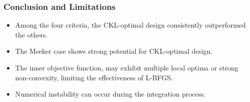 \documentclass[xcolor=dvipsnames,aspectratio=1610]{beamer}
\begin{document}



\begin{frame}
\frametitle{Conclusion and Limitations}

\begin{itemize}
\item Among the four criteria, the CKL-optimal design consistently outperformed the others.

\item The Meeker case shows strong potential for CKL-optimal design.

\item The inner objective function, may exhibit multiple local optima or strong non-convexity, limiting the effectiveness of L-BFGS.

\item Numerical instability can occur during the integration process.
\end{itemize}
\end{frame}

\end{document}
